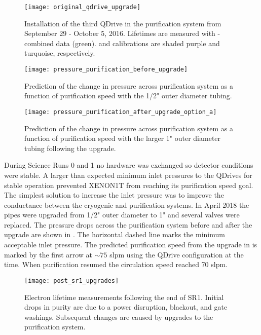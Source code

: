 \begin{figure}
\centering
\texttt{[image: original\_qdrive\_upgrade]}
\caption{Installation of the third QDrive in the purification system from September 29 - October 5, 2016.  Lifetimes are measured
with - combined data (green).   and \ambe calibrations are shaded purple and turquoise,
respectively.}
\label{fig:electron_lifetime_model_ops_original_qdrive_upgrade}
\end{figure}

\begin{figure}
\centering
\texttt{[image: pressure\_purification\_before\_upgrade]}
\caption{Prediction of the change in pressure across purification system as a function of purification speed with the 1/2" outer diameter
tubing.}
\label{fig:electron_lifetime_model_ops_original_pressure}
\end{figure}

\begin{figure}
\centering
\texttt{[image: pressure\_purification\_after\_upgrade\_option\_a]}
\caption{Prediction of the change in pressure across purification system as a function of purification speed with the larger 1" outer
diameter tubing following the upgrade.}
\label{fig:electron_lifetime_model_ops_improved_pressure}
\end{figure}

During Science Runs 0 and 1 no hardware was exchanged so detector conditions were stable.  A larger than expected minimum inlet pressures to
the QDrives for stable operation prevented XENON1T from reaching its purification speed goal.  The simplest solution to increase the inlet
pressure was to improve the conductance between the cryogenic and purification systems.  In April 2018 the pipes
were upgraded from 1/2" outer diameter to 1" and several valves were replaced.  The pressure drops across the purification system
before and after the upgrade are shown in
.  The horizontal dashed line
marks the minimum acceptable inlet pressure.  The predicted purification speed from the upgrade in
 is marked by the first arrow at ${\sim} 75$ slpm using the QDrive configuration at
the time.  When purification resumed the circulation speed reached 70 slpm.

\begin{figure}
\centering
\texttt{[image: post\_sr1\_upgrades]}
\caption{Electron lifetime measurements following the end of SR1.  Initial drops in purity are due to a power disruption, blackout, and gate
washings.  Subsequent changes are caused by upgrades to the purification system.}
\label{fig:electron_lifetime_model_ops_post_sr1}
\end{figure}

